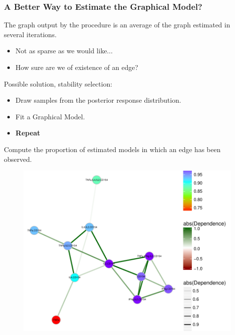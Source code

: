 \documentclass{beamer}
\theoremstyle{definition}
\begin{document}

\begin{frame}
\frametitle{A Better Way to Estimate the Graphical Model?}
The graph output by the procedure is an average of the graph estimated in several iterations. 
\begin{itemize}
	\item Not as sparse as we would like...
	\item How sure are we of existence of an edge?
\end{itemize}

\pause
\vspace{1 cm}
Possible solution, stability selection:
\begin{itemize}
	\item Draw samples from the posterior response distribution.
	\item Fit a Graphical Model.
	\item \textbf{Repeat}
\end{itemize}
Compute the proportion of estimated models in which an edge has been observed.
\end{frame}


\begin{figure}[]
\includegraphics[width=11 cm]{figures/RV144stability}
\end{figure}

\end{document}

